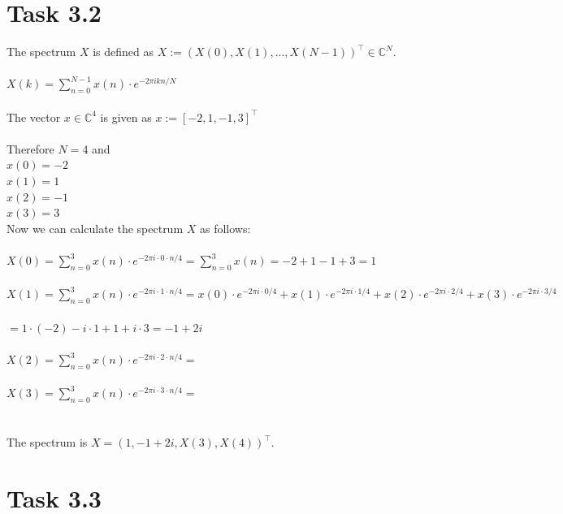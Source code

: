 \documentclass[12pt]{article}
\begin{document}
\section*{Task 3.2}
The spectrum $X$ is defined as $X:=(X(0),X(1),...,X(N-1))^\top \in \mathbb{C}^{N}$.\\\\
$X(k) = \sum_{n=0}^{N-1} x(n) \cdot e^{-2\pi ikn/N}$\\\\
The vector $x \in \mathbb{C}^{4}$ is given as $x:=[-2,1,-1,3]^\top$\\\\
Therefore $N=4$ and\\ 
$x(0)=-2$\\
$x(1)=1$\\
$x(2)=-1$\\ 
$x(3)=3$\\
Now we can calculate the spectrum $X$ as follows:\\\\
$X(0) = \sum_{n=0}^{3} x(n) \cdot e^{-2\pi i \cdot 0 \cdot n/4} = \sum_{n=0}^{3} x(n) = -2+1-1+3 = 1$\\\\
$X(1) = \sum_{n=0}^{3} x(n) \cdot e^{-2\pi i \cdot 1 \cdot n/4} = x(0) \cdot e^{-2\pi i \cdot 0/4} + x(1) \cdot e^{-2\pi i \cdot 1/4} + x(2) \cdot e^{-2\pi i \cdot 2/4} + x(3) \cdot e^{-2\pi i \cdot 3/4}$\\\\
$ = 1 \cdot (-2) - i \cdot 1 + 1 + i \cdot 3 = -1 + 2i$\\\\
$X(2) = \sum_{n=0}^{3} x(n) \cdot e^{-2\pi i \cdot 2 \cdot n/4} = $\\\\
$X(3) = \sum_{n=0}^{3} x(n) \cdot e^{-2\pi i \cdot 3 \cdot n/4} = $\\\\\\
The spectrum is $X=(1, -1+2i, X(3), X(4))^\top$.
 \section*{Task 3.3}
\end{document}
